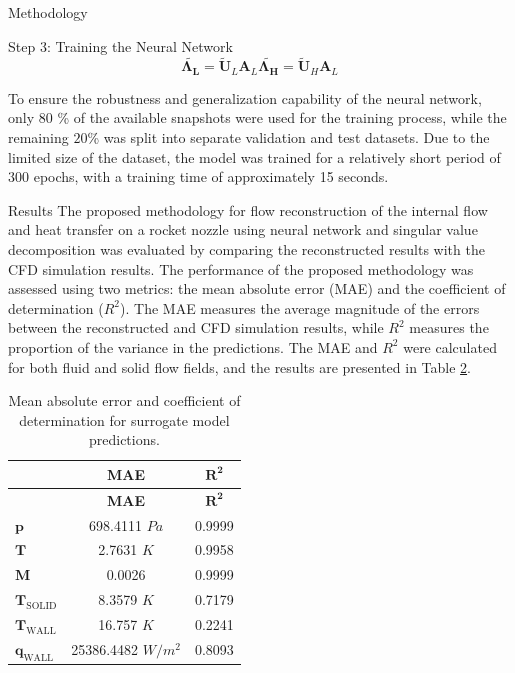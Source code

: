 \begin{frame}{Methodology}
\begin{block}{Step 3: Training the Neural Network}
\[\tilde{\mathbf{\Lambda_L}}= \tilde{\mathbf{U}}_L \mathbf{A}_L 
    \tilde{\mathbf{\Lambda_H}}= \tilde{\mathbf{U}}_H \mathbf{A}_L
    \label{eq:projected_matrices}\]

To ensure the robustness and generalization capability of the neural
network, only \(80\) \% of the available snapshots were used for the
training process, while the remaining \(20\)\% was split into separate
validation and test datasets. Due to the limited size of the dataset,
the model was trained for a relatively short period of \(300\) epochs,
with a training time of approximately 15 seconds.
\end{block}
\end{frame}

\begin{frame}{Results}
\protect\hypertarget{results}{}
The proposed methodology for flow reconstruction of the internal flow
and heat transfer on a rocket nozzle using neural network and singular
value decomposition was evaluated by comparing the reconstructed results
with the CFD simulation results. The performance of the proposed
methodology was assessed using two metrics: the mean absolute error
(MAE) and the coefficient of determination (\(R^2\)). The MAE measures
the average magnitude of the errors between the reconstructed and CFD
simulation results, while \(R^2\) measures the proportion of the
variance in the predictions. The MAE and \(R^2\) were calculated for
both fluid and solid flow fields, and the results are presented in Table
\protect\hyperlink{tab:error}{2}.

\hypertarget{tab:error}{}
\begin{longtable}[]{@{}lcc@{}}
\caption{Mean absolute error and coefficient of determination for
surrogate model predictions.}\tabularnewline
\toprule()
& \textbf{MAE} & \(\mathbf{R^2}\) \\
\midrule()
\endfirsthead
\toprule()
& \textbf{MAE} & \(\mathbf{R^2}\) \\
\midrule()
\endhead
\(\mathbf{p}\) & 698.4111 \(Pa\) & 0.9999 \\
\(\mathbf{T}\) & 2.7631 \(K\) & 0.9958 \\
\(\mathbf{M}\) & 0.0026 & 0.9999 \\
\(\mathbf{T}_{\text{SOLID}}\) & 8.3579 \(K\) & 0.7179 \\
\(\mathbf{T}_{\text{WALL}}\) & 16.757 \(K\) & 0.2241 \\
\(\mathbf{q}_{\text{WALL}}\) & 25386.4482 \(W/m^2\) & 0.8093 \\
\bottomrule()
\end{longtable}


\end{frame}
